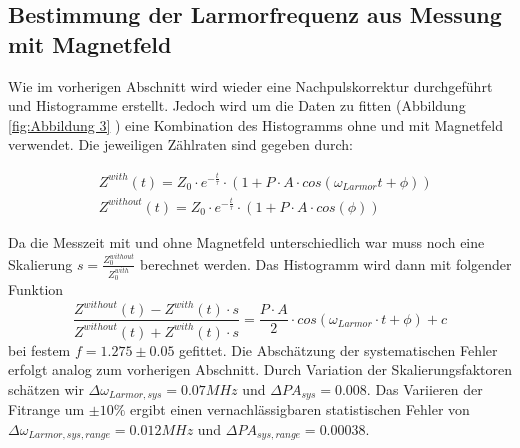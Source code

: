 \subsection{Bestimmung der Larmorfrequenz aus Messung mit Magnetfeld}
Wie im vorherigen Abschnitt wird wieder eine Nachpulskorrektur durchgeführt und Histogramme erstellt. Jedoch wird um die Daten zu fitten (Abbildung \ref{fig:Abbildung 3}
) eine Kombination des Histogramms ohne und mit Magnetfeld verwendet. Die jeweiligen Zählraten sind gegeben durch:

\begin{align}
\label{eq:12}
&Z^{with}(t)= Z_0 \cdot e^{-\frac{t}{\tau}} \cdot \left(
1 + P\cdot A \cdot
cos\left(\omega _{Larmor} t+\phi \right)
\right)\\
&Z^{without}(t)
= Z_0 \cdot e^{-\frac{t}{\tau}} \cdot \left(
1 + P\cdot A \cdot
cos\left(\phi \right)
\right)
\end{align}

\noindent Da die Messzeit mit und ohne Magnetfeld unterschiedlich war muss noch eine Skalierung $s = \frac{Z^{without} _0}{Z^{with} _0}$ berechnet werden. Das Histogramm wird dann mit folgender Funktion 
\begin{equation}
\label{eq:14}
\frac{Z^{without} (t)-Z^{with}(t)\cdot s}{Z^{without}(t)+Z^{with} (t) \cdot s} = \frac{P \cdot A}{2} \cdot
cos\left(
\omega_{Larmor} \cdot t
+
\phi
\right)
+
c
\end{equation}
bei festem $f=1.275 \pm 0.05$ gefittet. Die Abschätzung der systematischen Fehler erfolgt analog zum vorherigen Abschnitt. Durch Variation der Skalierungsfaktoren schätzen wir 
$\Delta \omega_{Larmor,sys} = 0.07 MHz$ und $\Delta PA_{sys} = 0.008$. Das Variieren der Fitrange um $\pm 10\%$ ergibt einen vernachlässigbaren statistischen Fehler von $\Delta \omega_{Larmor,sys,range} = 0.012 MHz$ und $\Delta PA_{sys,range} = 0.00038$.

